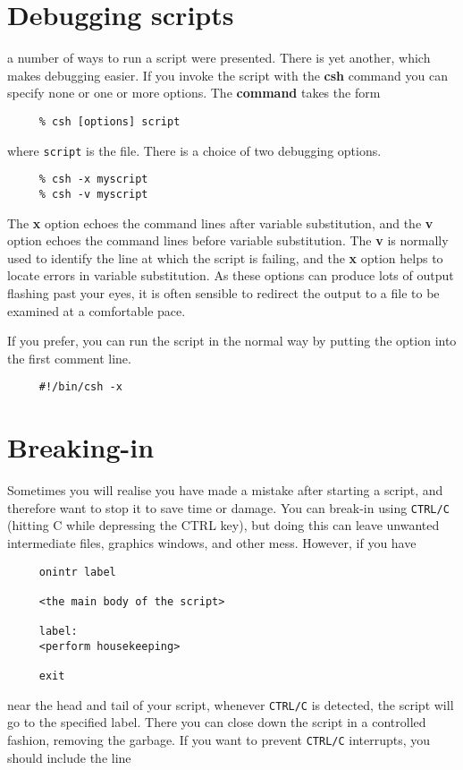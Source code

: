\newpage
\section{Debugging scripts
\label{sc4_se_debugging}}

  a number of ways to run a
script were presented.  There is yet another, which makes debugging
easier.  If you invoke the script with the {\bf csh} command you can
specify none or one or more options.  The {\bf command} takes the form

\small
\begin{verbatim}
     % csh [options] script
\end{verbatim}
\normalsize
where {\tt script} is the file.  There is a choice of two debugging
options.

\small
\begin{verbatim}
     % csh -x myscript
     % csh -v myscript
\end{verbatim}
\normalsize
The {\bf x} option echoes the command lines after variable substitution,
and the {\bf v} option echoes the command lines before variable
substitution.  The {\bf v} is normally used to identify the line at
which the script is failing, and the {\bf x} option helps to locate
errors in variable substitution.  As these options can produce lots of
output flashing past your eyes, it is often sensible to redirect the
output to a file to be examined at a comfortable pace.

If you prefer, you can run the script in the normal way by putting the
option into the first comment line.

\small
\begin{verbatim}
     #!/bin/csh -x
\end{verbatim}
\normalsize

\section{Breaking-in
\label{sc4_se_break_in}}

Sometimes you will realise you have made a mistake after starting a
script, and therefore want to stop it to save time or damage.  You can
break-in using {\tt CTRL/C} (hitting C while depressing the CTRL key),
but doing this can leave unwanted intermediate files, graphics
windows, and other mess.  However, if you have

\small
\begin{verbatim}
     onintr label

     <the main body of the script>

     label:
     <perform housekeeping>

     exit
\end{verbatim}
\normalsize
near the head and tail of your script, whenever {\tt CTRL/C} is
detected, the script will go to the specified label.  There you can
close down the script in a controlled fashion, removing the garbage.  If
you want to prevent {\tt CTRL/C} interrupts, you should include the line

